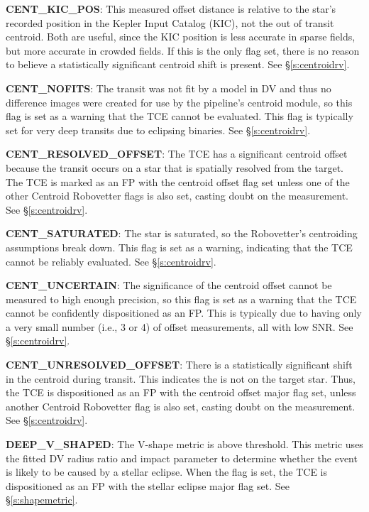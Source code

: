 \textbf{CENT\_KIC\_POS}: This measured offset distance is relative to the star's recorded position in the Kepler Input Catalog (KIC), not the out of transit centroid. Both are useful, since the KIC position is less accurate in sparse fields, but more accurate in crowded fields. If this is the only flag set, there is no reason to believe a statistically significant centroid shift is present. See \S\ref{s:centroidrv}.

\textbf{CENT\_NOFITS}: The transit was not fit by a model in DV and thus no difference images were created for use by the pipeline's centroid module, so this flag is set as a warning that the TCE cannot be evaluated. This flag is typically set for very deep transits due to eclipsing binaries. See \S\ref{s:centroidrv}.

\textbf{CENT\_RESOLVED\_OFFSET}: The TCE has a significant centroid offset because the transit occurs on a star that is spatially resolved from the target. The TCE is marked as an FP with the centroid offset flag set unless one of the other Centroid Robovetter flags is also set, casting doubt on the measurement. See \S\ref{s:centroidrv}.

\textbf{CENT\_SATURATED}: The star is saturated, so the Robovetter's centroiding assumptions break down. This flag is set as a warning, indicating that the TCE cannot be reliably evaluated.  See \S\ref{s:centroidrv}.

\textbf{CENT\_UNCERTAIN}: The significance of the centroid offset cannot be measured to high enough precision, so this flag is set as a warning that the TCE cannot be confidently dispositioned as an FP. This is typically due to having only a very small number (i.e., 3 or 4) of offset measurements, all with low SNR. See \S\ref{s:centroidrv}.

\textbf{CENT\_UNRESOLVED\_OFFSET}: There is a statistically significant shift in the centroid during transit. This indicates the is not on the target star. Thus, the TCE is dispositioned as an FP with the centroid offset major flag set, unless another Centroid Robovetter flag is also set, casting doubt on the measurement. See \S\ref{s:centroidrv}.

\textbf{DEEP\_V\_SHAPED}: The V-shape metric is above threshold. This metric uses the fitted DV radius ratio and impact parameter to determine whether the event is likely to be caused by a stellar eclipse. When the flag is set, the TCE is dispositioned as an FP with the stellar eclipse major flag set. See \S\ref{s:shapemetric}.

